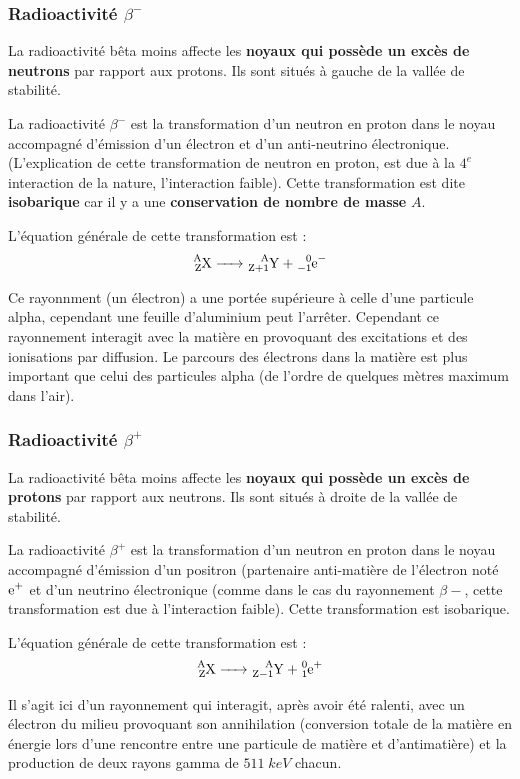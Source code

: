 \documentclass[11pt,a4paper]{article}
\begin{document}
\subsubsection{Radioactivité $\beta^-$}
La radioactivité bêta moins affecte les \textbf{noyaux qui possède un excès de neutrons} par rapport aux protons. Ils sont situés à gauche de la vallée de stabilité.
 
La radioactivité $\beta^-$ est la transformation d'un neutron en proton dans le noyau accompagné d'émission d'un électron et d'un anti-neutrino électronique. (L'explication de cette transformation de neutron en proton, est due à la $4^e$ interaction de la nature, l'interaction faible). Cette transformation est dite \textbf{isobarique} car il y a une \textbf{conservation de nombre de masse} $A$.

L'équation générale de cette transformation est : 
\[\ce{^A_ZX -> ^{A}_{Z+1}Y + ^0_{-1}e-}\]

Ce rayonnment (un électron) a une portée supérieure à celle d'une particule alpha, cependant une feuille d'aluminium peut l'arrêter. Cependant ce rayonnement interagit avec la matière en provoquant des excitations et des ionisations par diffusion. Le parcours des électrons dans la matière est plus important que celui des particules alpha (de l'ordre de quelques mètres maximum dans l'air). 

\subsubsection{Radioactivité $\beta^+$}
La radioactivité bêta moins affecte les \textbf{noyaux qui possède un excès de protons} par rapport aux neutrons. Ils sont situés à droite de la vallée de stabilité.
 
La radioactivité $\beta^+$ est la transformation d'un neutron en proton dans le noyau accompagné d'émission d'un positron (partenaire anti-matière de l'électron noté $\ce{e+}$ et d'un neutrino électronique (comme dans le cas du rayonnement $\beta-$, cette transformation est due à l'interaction faible). Cette transformation est isobarique. 

L'équation générale de cette transformation est : 
\[\ce{^A_ZX -> ^{A}_{Z-1}Y + ^0_{1}e+}\]

Il s'agit ici d'un rayonnement qui interagit, après avoir été ralenti, avec un électron du milieu provoquant son annihilation (conversion totale de la matière en énergie lors d'une rencontre entre une particule de matière et d'antimatière) et la production de deux rayons gamma de $511\; keV$ chacun.
\end{document}
